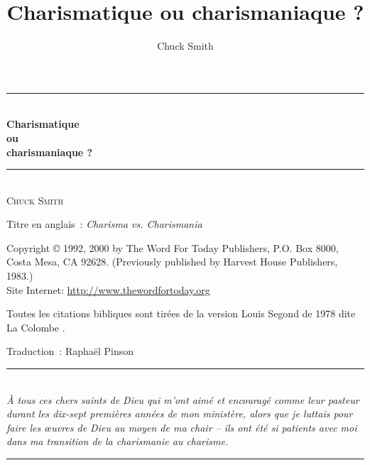 \documentclass[paper=6.13in:9.21in,pagesize=pdftex,12pt,DIV=calc]{scrbook}
\title{Charismatique ou \og charismaniaque \fg{}?}
\author{Chuck Smith}
\begin{document}
\newcommand{\HRule}{\rule{\linewidth}{0.5mm}}

\pagestyle{empty}

\begin{titlepage}
\begin{center}
\mbox{}
\vfill
\HRule \\[0.4cm]
{ \LARGE \bfseries Charismatique\\ ou\\ \og charismaniaque \fg{}?}\\[0.4cm]

\HRule \\[1.5cm]
\textsc{\Large Chuck Smith}\\[1.5cm]
\vfill
\mbox{}
\end{center}
\end{titlepage}


\newpage
\mbox{}
\vfill
Titre en anglais~: \emph{Charisma vs. Charismania}

Copyright \copyright{} 1992, 2000 by The Word For Today Publishers, P.O. Box 8000, \\
Costa Mesa, CA 92628. (Previously published by Harvest House Publishers, 1983.) \\
Site Internet: \url{http://www.thewordfortoday.org}

Toutes les citations bibliques sont tirées de la version Louis Segond de 1978
 dite \og La Colombe \fg{}.

Traduction~: Raphaël Pinson


\newpage
\mbox{}
\vfill
\begin{center}
\HRule \\[0.4cm]
\emph{À tous ces chers saints de Dieu qui m'ont aimé et encouragé comme leur
 pasteur durant les dix-sept premières années de mon ministère, alors que je
 luttais pour faire les œuvres de Dieu au moyen de ma chair -- ils ont été
 si patients avec moi dans ma transition de la charismanie au charisme.}
\HRule \\[1.5cm]
\end{center}
\vfill
\mbox{}
\newpage


\tableofcontents

\pagestyle{headings}







\printindex
\end{document}
